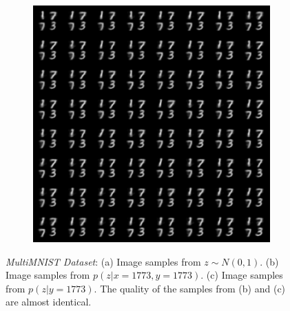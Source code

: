 \documentclass{article}
\begin{document}
\begin{figure}[!h]
\begin{subfigure}[b]{.24\linewidth}
        \caption{}
    \end{subfigure}
    \begin{subfigure}[b]{.24\linewidth}
        \centering
        \includegraphics[width=\linewidth]{multimnist_mmvae_condition_text_1773_image_sample.png}
        \caption{}
    \end{subfigure}
    \caption{\emph{MultiMNIST Dataset}: (a) Image samples from $z \sim N(0, 1)$. (b) Image samples from $p(z|x=1773,y=1773)$. (c) Image samples from $p(z|y=1773)$. The quality of the samples from (b) and (c) are almost identical.}
    \label{fig:multimnist:samples}
\end{figure}
\end{document}
